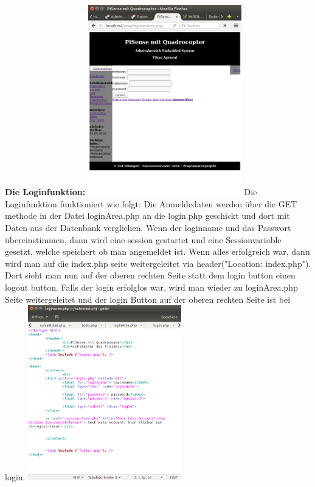 \documentclass[fleqn,10pt]{SelfArx} %
\begin{document}
\newline 
\textbf{Die Loginfunktion:} \newline 
\includegraphics[width=0.5\textwidth]{1.png} 
\newline 
\newline 
\newline 
Die Loginfunktion funktioniert wie folgt: Die Anmeldedaten werden über die GET methode in der Datei loginArea.php an die login.php geschickt und dort mit Daten aus der Datenbank verglichen. Wenn der loginname und das Passwort übereinstimmen, dann wird eine session gestartet und eine Sessionvariable gesetzt, welche speichert ob man angemeldet ist. Wenn alles erfolgreich war, dann wird man auf die index.php seite weitergeleitet via header("Location: index.php"). Dort sieht man nun auf der oberen rechten Seite statt dem login button einen logout button. Falls der login erfolglos war, wird man wieder zu loginArea.php Seite weitergeleitet und der login Button auf der oberen rechten Seite ist bei login.
\newline 
\includegraphics[width=0.5\textwidth]{2.png} 
\end{document}
